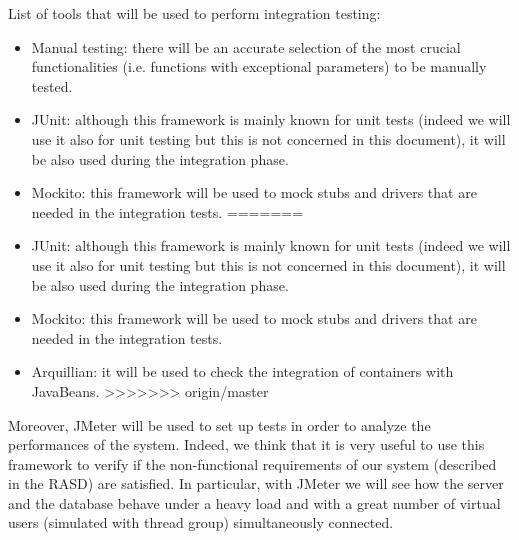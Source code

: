 List of tools that will be used to perform integration testing:
\begin{itemize}
<<<<<<< HEAD
    \item Manual testing: there will be an accurate selection of the most crucial functionalities (i.e. functions with exceptional parameters) to be manually tested.
    \item JUnit: although this framework is mainly known for unit tests (indeed we will use it also for unit testing but this is not concerned in this document), it will be also used during the integration phase.
    \item Mockito: this framework will be used to mock stubs and drivers that are needed in the integration tests.
=======
    \item JUnit: although this framework is mainly known for unit tests (indeed we will use it also for unit testing but this is not concerned in this document), it will be also used during the integration phase.
    \item Mockito: this framework will be used to mock stubs and drivers that are needed in the integration tests.
    \item Arquillian: it will be used to check the integration of containers with JavaBeans.
>>>>>>> origin/master
\end{itemize}
Moreover, JMeter will be used to set up tests in order to analyze the performances of the system. Indeed, we think that it is very useful to use this framework to verify if the non-functional requirements of our system (described in the RASD) are satisfied.
\newline
In particular, with JMeter we will see how the server and the database behave under a heavy load and with a great number of virtual users (simulated with thread group) simultaneously connected.